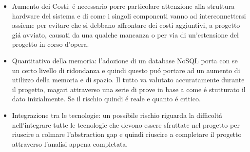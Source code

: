\begin{itemize}
  \item Aumento dei Costi: \'e necessario porre particolare attenzione alla struttura hardware del sistema e di come i singoli componenti vanno ad interconnettersi assieme per evitare che si debbano affrontare dei costi aggiuntivi, a progetto gi\'a avviato, causati da una qualche mancanza o per via di un'estensione del progetto in corso d'opera.
  \item Quantitativo della memoria: l'adozione di un database NoSQL porta con se un certo livello di ridondanza e quindi questo pu\'o portare ad un aumento di utilizzo della memoria e di spazio. Il tutto va valutato accuratamente durante il progetto, magari attraverso una serie di prove in base a come \'e stutturato il dato inizialmente. Se il rischio quindi \'e reale e quanto \'e critico.
  \item Integrazione tra le tecnologie: un possibile rischio riguarda la difficolt\'a nell'integrare tutte le tecnologie che devono essere sfruttate nel progetto per riuscire a colmare l'abstraction gap e quindi riuscire a completare il progetto attraverso l'analisi appena completata.
\end{itemize}
